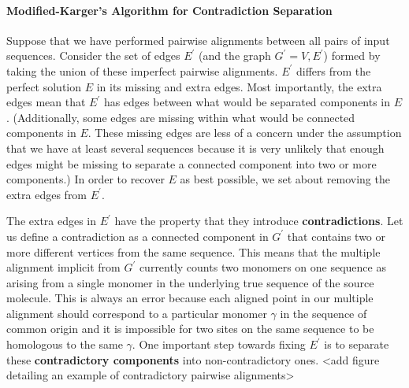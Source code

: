 \documentclass[11pt]{article}
\begin{document}
\paragraph{Modified-Karger's Algorithm for Contradiction Separation\newline}
\par{
Suppose that we have performed pairwise alignments between all pairs of input sequences.  Consider the set of edges $E^\prime$ (and the graph $G^\prime={V,E^\prime}$) formed by taking the union of these imperfect pairwise alignments.  $E^\prime$ differs from the perfect solution $E$ in its missing and extra edges.  Most importantly, the extra edges mean that $E^\prime$ has edges between what would be separated components in $E$.  (Additionally, some edges are missing within what would be connected components in $E$. These missing edges are less of a concern under the assumption that we have at least several sequences because it is very unlikely that enough edges might be missing to separate a connected component into two or more components.) In order to recover $E$ as best possible, we set about removing the extra edges from $E^\prime$.
}
\par{
The extra edges in $E^\prime$ have the property that they introduce \textbf{contradictions}.  Let us define a contradiction as a connected component in $G^\prime$ that contains two or more different vertices from the same sequence.  This means that the multiple alignment implicit from $G^\prime$ currently counts two monomers on one sequence as arising from a single monomer in the underlying true sequence of the source molecule.  This is always an error because each aligned point in our multiple alignment should correspond to a particular monomer $\gamma$ in the sequence of common origin and it is impossible for two sites on the same sequence to be homologous to the same $\gamma$.  One important step towards fixing $E^\prime$ is to separate these \textbf{contradictory components} into non-contradictory ones.
<add figure detailing an example of contradictory pairwise alignments>}
\end{document}
